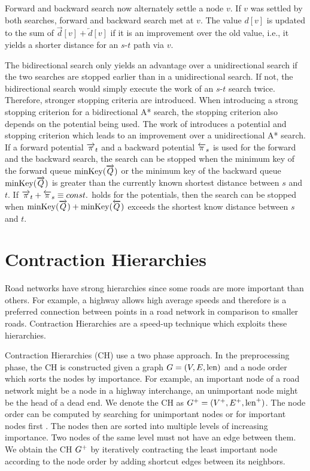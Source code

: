 Forward and backward search now alternately settle a node $v$. If $v$ was settled by both searches, forward and backward search met at $v$. The value $d[v]$ is updated to the sum of $\overrightarrow{d}[v] + \overleftarrow{d}[v]$ if it is an improvement over the old value, i.e., it yields a shorter distance for an $s$-$t$ path via $v$.

The bidirectional search only yields an advantage over a unidirectional search if the two searches are stopped earlier than in a unidirectional search. If not, the bidirectional search would simply execute the work of an $s$-$t$ search twice. Therefore, stronger stopping criteria are introduced. When introducing a strong stopping criterion for a bidirectional A* search, the stopping criterion also depends on the potential being used. The work of \cite{goldberg:2005a} introduces a potential and stopping criterion which leads to an improvement over a unidirectional A* search. If a forward potential $\overrightarrow{\pi}_t$ and a backward potential $\overleftarrow{\pi}_s$ is used for the forward and the backward search, the search can be stopped when the minimum key of the forward queue $\operatorname{minKey}(\overrightarrow{Q})$ or the minimum key of the backward queue $\operatorname{minKey}(\overrightarrow{Q})$ is greater than the currently known shortest distance between $s$ and $t$. If $\overrightarrow{\pi}_t + \overleftarrow{\pi}_s \equiv const.$ holds for the potentials, then the search can be stopped when $\operatorname{minKey}(\overrightarrow{Q}) + \operatorname{minKey}(\overleftarrow{Q})$ exceeds the shortest know distance between $s$ and $t$.

\section{Contraction Hierarchies\label{sec:ch}}
Road networks have strong hierarchies since some roads are more important than others. For example, a highway allows high average speeds and therefore is a preferred connection between points in a road network in comparison to smaller roads. Contraction Hierarchies \cite{geisberger:2012} are a speed-up technique which exploits these hierarchies.

Contraction Hierarchies (CH) use a two phase approach. In the preprocessing phase, the CH is constructed given a graph $G=(V,E,\operatorname{len})$ and a node order which sorts the nodes by importance. For example, an important node of a road network might be a node in a highway interchange, an unimportant node might be the head of a dead end. We denote the CH as $G^+ = (V^+,E^+,\operatorname{len}^+)$. The node order can be computed by searching for unimportant nodes \cite{geisberger:2012} or for important nodes first \cite{abraham:2012,delling:2014}. The nodes then are sorted into multiple levels of increasing importance. Two nodes of the same level must not have an edge between them. We obtain the CH $G^+$ by iteratively contracting the least important node according to the node order by adding shortcut edges between its neighbors.

